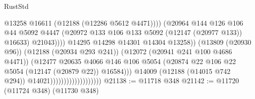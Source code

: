 \begin{lexlean}{RustStd}
\begin{coremodule}
                                                          @13258
                                                          @16611
                                                          (@12188 (@12286 @5612 @4471))))
                                                      (@20964
                                                        @144
                                                        @126
                                                        @106
                                                        @44
                                                        @5092
                                                        @4447
                                                        (@20972
                                                          @133
                                                          @106
                                                          @133
                                                          @5092
                                                          (@12147 (@20977 @133))
                                                          @16633)
                                                        @21043))))
                                                @14295
                                                @14298
                                                @14301
                                                @14304
                                                @13258))
                                            (@13809 (@20930 @96))
                                            (@12188 (@20934 @293 @241))
                                            (@12072 (@20941 @241 @100 @4686 @4471))
                                            (@12477
                                              @20635
                                              @4066
                                              @146
                                              @106
                                              @5054
                                              (@20874
                                                @22
                                                @106
                                                @22
                                                @5054
                                                (@12147 (@20879 @22))
                                                @16584)))
                                          @14009
                                          (@12188 (@14015 @742 @294))
                                          @14021)))))))))))))))))))
@21138 := @11718 @348
@21142 := @11720 (@11724 @348) (@11730 @348)

\end{coremodule}
\end{lexlean}
